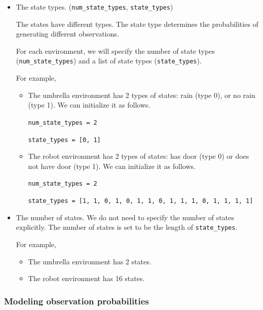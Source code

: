 \documentclass[12pt]{article}
\begin{document}
\begin{itemize}
    \item The state types. (\verb+num_state_types+, \verb+state_types+)
        
        The states have different types. The state type determines the probabilities of generating different observations.
        
        For each environment, we will specify the number of state types (\verb+num_state_types+) and a list of state types (\verb+state_types+).
        
        For example,
        \begin{itemize}
            \item The umbrella environment has 2 types of states: rain (type 0), or no rain (type 1). We can initialize it as follows.
            
            \verb+num_state_types = 2+
            
            \verb+state_types = [0, 1]+
            
            \item The robot environment has 2 types of states: has door (type 0) or does not have door (type 1). We can initialize it as follows.
            
            \verb+num_state_types = 2+
            
            \verb+state_types = [1, 1, 0, 1, 0, 1, 1, 0, 1, 1, 1, 0, 1, 1, 1, 1]+
            
        \end{itemize}

    \item The number of states. We do not need to specify the number of states explicitly. The number of states is set to be the length of \verb+state_types+.

    For example, 
        \begin{itemize}
            \item The umbrella environment has 2 states.
            \item The robot environment has 16 states.
        \end{itemize}         


\end{itemize}


\subsubsection{Modeling observation probabilities}
\end{document}
